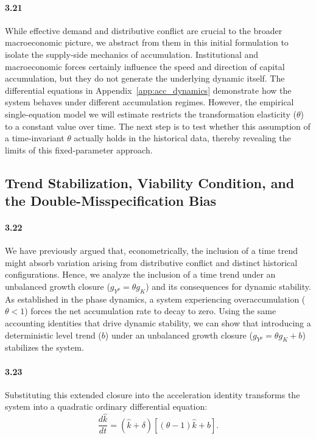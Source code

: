 \paragraph{3.21}
While effective demand and distributive conflict are crucial to the broader macroeconomic picture, we abstract from them in this initial formulation to isolate the supply-side mechanics of accumulation. Institutional and macroeconomic forces certainly influence the speed and direction of capital accumulation, but they do not generate the underlying dynamic itself. The differential equations in Appendix~\ref{app:acc_dynamics} demonstrate how the system behaves under different accumulation regimes. However, the empirical single-equation model we will estimate restricts the transformation elasticity ($\theta$) to a constant value over time. The next step is to test whether this assumption of a time-invariant $\theta$ actually holds in the historical data, thereby revealing the limits of this fixed-parameter approach.

\subsection{Trend Stabilization, Viability Condition, and the Double-Misspecification Bias}
\label{subsec:trend_stabilized_closure}

\paragraph{3.22}
We have previously argued that, econometrically, the inclusion of a time trend might absorb variation arising from distributive conflict and distinct historical configurations. Hence, we analyze the inclusion of a time trend under an unbalanced growth closure ($g_{Y^p} = \theta g_K$) and its consequences for dynamic stability. As established in the phase dynamics, a system experiencing overaccumulation ($\theta < 1$) forces the net accumulation rate to decay to zero. Using the same accounting identities that drive dynamic stability, we can show that introducing a deterministic level trend ($b$) under an unbalanced growth closure ($g_{Y^p} = \theta g_K + b$) stabilizes the system.

\paragraph{3.23}
Substituting this extended closure into the acceleration identity transforms the system into a quadratic ordinary differential equation:
\begin{equation}
\frac{d\hat{k}}{dt} = (\hat{k} + \delta)\left[(\theta - 1)\hat{k} + b\right].
\end{equation}


